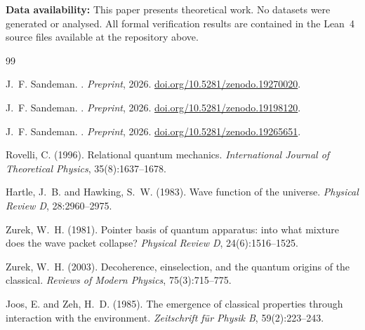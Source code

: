 \documentclass[11pt,a4paper]{article}
\theoremstyle{plain}
\theoremstyle{definition}
\theoremstyle{remark}
\begin{document}
\textbf{Data availability:} This paper presents theoretical work. No datasets
were generated or analysed. All formal verification results are contained in the
Lean~4 source files available at the repository above.


\begin{thebibliography}{99}

J.~F. Sandeman.
.
\newblock \textit{Preprint}, 2026.
\newblock \href{https://doi.org/10.5281/zenodo.19270020}{doi.org/10.5281/zenodo.19270020}.


J.~F. Sandeman.
.
\newblock \textit{Preprint}, 2026.
\newblock \href{https://doi.org/10.5281/zenodo.19198120}{doi.org/10.5281/zenodo.19198120}.


J.~F. Sandeman.
.
\newblock \textit{Preprint}, 2026.
\newblock \href{https://doi.org/10.5281/zenodo.19265651}{doi.org/10.5281/zenodo.19265651}.


Rovelli, C. (1996).
\newblock Relational quantum mechanics.
\newblock \emph{International Journal of Theoretical Physics}, 35(8):1637--1678.

Hartle, J.~B. and Hawking, S.~W. (1983).
\newblock Wave function of the universe.
\newblock \emph{Physical Review D}, 28:2960--2975.

Zurek, W.~H. (1981).
\newblock Pointer basis of quantum apparatus: into what mixture does the wave packet collapse?
\newblock \emph{Physical Review D}, 24(6):1516--1525.

Zurek, W.~H. (2003).
\newblock Decoherence, einselection, and the quantum origins of the classical.
\newblock \emph{Reviews of Modern Physics}, 75(3):715--775.

Joos, E. and Zeh, H.~D. (1985).
\newblock The emergence of classical properties through interaction with the environment.
\newblock \emph{Zeitschrift f\"{u}r Physik B}, 59(2):223--243.


\end{thebibliography}
\end{document}
